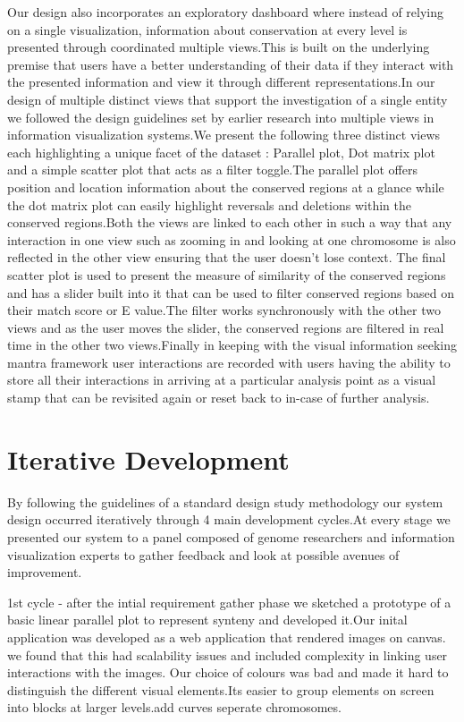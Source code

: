 Our design also incorporates an exploratory dashboard where instead of relying on a single visualization, information about conservation at every level is presented through coordinated multiple views.This is built on the underlying premise that users have a better understanding of their data if they interact with the presented information and view it through different representations\cite{Roberts}.In our design of multiple distinct views that support the investigation of a single entity we followed the design guidelines set by earlier research into multiple views in information visualization systems\cite{WangBaldonado}.We present the following three distinct views each highlighting a unique facet of the dataset : Parallel plot, Dot matrix plot and a simple scatter plot that acts as a filter toggle.The parallel plot offers position and location information about the conserved regions at a glance while the dot matrix plot can easily highlight reversals and deletions within the conserved regions.Both the views are linked to each other in such a way that any interaction in one view such as zooming in and looking at one chromosome is also reflected in the other view ensuring that the user doesn't lose context. The final scatter plot is used to present the measure of similarity of the conserved regions and has a slider built into it that can be used to filter conserved regions based on their match score or E value.The filter works synchronously with the other two views and as the user moves the slider, the conserved regions are filtered in real time in the other two views.Finally in keeping with the visual information seeking mantra framework user interactions are recorded with users having the ability to store all their interactions in arriving at a particular analysis point as a visual stamp that can be revisited again or reset back to in-case of further analysis.

\section{Iterative Development}
By following the guidelines of a standard design study methodology\cite{5290695} our system design occurred iteratively through 4 main development cycles.At every stage we presented our system to a panel composed of genome researchers and information visualization experts to gather feedback and look at possible avenues of improvement.

1st cycle - after the intial requirement gather phase we sketched a prototype of a basic linear parallel plot to represent synteny and developed it.Our inital application was developed as a web application that rendered images on canvas. we found that this had scalability issues and included complexity in linking user interactions with the images. Our choice of colours was bad and made it hard to distinguish the different visual elements.Its easier to group elements on screen into blocks at larger levels.add curves seperate chromosomes.

